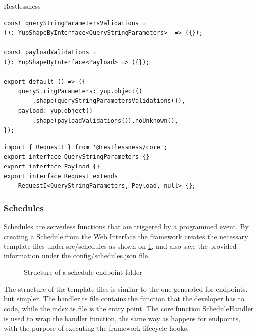 \begin{chapter}{Restlessness}
    \bigskip
    \begin{lstlisting}[caption=validations.ts content, label={lst:validations_ts}]
const queryStringParametersValidations =
(): YupShapeByInterface<QueryStringParameters>  => ({});

const payloadValidations =
(): YupShapeByInterface<Payload> => ({});

export default () => ({
    queryStringParameters: yup.object()
        .shape(queryStringParametersValidations()),
    payload: yup.object()
        .shape(payloadValidations()).noUnknown(),
});
    \end{lstlisting}

    \bigskip
    \begin{lstlisting}[caption=interfaces.ts content, label={lst:interfaces_ts}]
import { RequestI } from '@restlessness/core';
export interface QueryStringParameters {}
export interface Payload {}
export interface Request extends
    RequestI<QueryStringParameters, Payload, null> {};
    \end{lstlisting}

    \subsubsection{Schedules}
    \label{subsec:schedules}
    Schedules are serverless functions that are triggered by a programmed event.
    By creating a Schedule from the Web Interface the framework creates the necessary
    template files under src/schedules as shown on \ref{fig:new_schedule_folder_structure},
    and also save the provided information under the config/schedules.json file.

    \begin{figure}
        \begin{minipage}{\linewidth}
        \end{minipage}
        \caption{Structure of a schedule endpoint folder}
        \label{fig:new_schedule_folder_structure}
    \end{figure}

    The structure of the template files is similar to the one generated for endpoints,
    but simpler. The handler.ts file contains the function that the developer has
    to code, while the index.ts file is the entry point.
    The core function ScheduleHandler is used to wrap the handler function, the same
    way as happens for endpoints, with the purpose of executing the framework lifecycle
    hooks.


\end{chapter}
